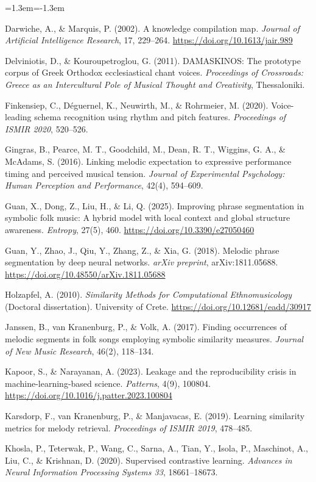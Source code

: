 \documentclass[a4paper]{article}
\newenvironment{reflist}{\begin{list}{}{\leftmargin=1.3em\itemindent=-1.3em\itemsep=0pt\parsep=0pt}\fontsize{9}{9.5}\selectfont}{\end{list}}
\begin{document}
\begin{reflist}
\item Darwiche, A., \& Marquis, P. (2002). A knowledge compilation map. \emph{Journal of Artificial Intelligence Research}, 17, 229--264. \url{https://doi.org/10.1613/jair.989}
\item Delviniotis, D., \& Kouroupetroglou, G. (2011). DAMASKINOS: The prototype corpus of Greek Orthodox ecclesiastical chant voices. \emph{Proceedings of Crossroads: Greece as an Intercultural Pole of Musical Thought and Creativity}, Thessaloniki.
\item Finkensiep, C., Déguernel, K., Neuwirth, M., \& Rohrmeier, M. (2020). Voice-leading schema recognition using rhythm and pitch features. \emph{Proceedings of ISMIR 2020}, 520--526.
\item Gingras, B., Pearce, M. T., Goodchild, M., Dean, R. T., Wiggins, G. A., \& McAdams, S. (2016). Linking melodic expectation to expressive performance timing and perceived musical tension. \emph{Journal of Experimental Psychology: Human Perception and Performance}, 42(4), 594--609.
\item Guan, X., Dong, Z., Liu, H., \& Li, Q. (2025). Improving phrase segmentation in symbolic folk music: A hybrid model with local context and global structure awareness. \emph{Entropy}, 27(5), 460. \url{https://doi.org/10.3390/e27050460}
\item Guan, Y., Zhao, J., Qiu, Y., Zhang, Z., \& Xia, G. (2018). Melodic phrase segmentation by deep neural networks. \emph{arXiv preprint}, arXiv:1811.05688. \url{https://doi.org/10.48550/arXiv.1811.05688}
\item Holzapfel, A. (2010). \emph{Similarity Methods for Computational Ethnomusicology} (Doctoral dissertation). University of Crete. \url{https://doi.org/10.12681/eadd/30917}
\item Janssen, B., van Kranenburg, P., \& Volk, A. (2017). Finding occurrences of melodic segments in folk songs employing symbolic similarity measures. \emph{Journal of New Music Research}, 46(2), 118--134.
\item Kapoor, S., \& Narayanan, A. (2023). Leakage and the reproducibility crisis in machine-learning-based science. \emph{Patterns}, 4(9), 100804. \url{https://doi.org/10.1016/j.patter.2023.100804}
\item Karsdorp, F., van Kranenburg, P., \& Manjavacas, E. (2019). Learning similarity metrics for melody retrieval. \emph{Proceedings of ISMIR 2019}, 478--485.
\item Khosla, P., Teterwak, P., Wang, C., Sarna, A., Tian, Y., Isola, P., Maschinot, A., Liu, C., \& Krishnan, D. (2020). Supervised contrastive learning. \emph{Advances in Neural Information Processing Systems 33}, 18661--18673.

\end{reflist}
\end{document}
